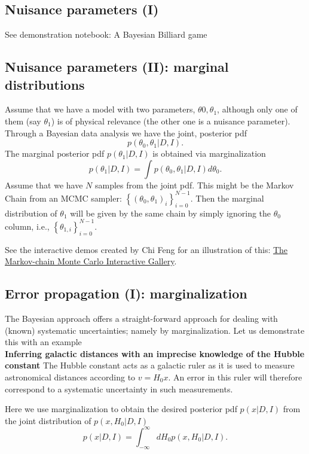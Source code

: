 \documentclass[%
oneside,                 %
final,                   %
10pt]{article}
\begin{document}
\subsection{Nuisance parameters (I)}
See demonstration notebook: A Bayesian Billiard game

\subsection{Nuisance parameters (II): marginal distributions}
Assume that we have a model with two parameters, $\theta0,\theta_1$, although only one of them (say $\theta_1$) is of physical relevance (the other one is a nuisance parameter). Through a Bayesian data analysis we have the joint, posterior pdf
\[
p(\theta_0, \theta_1 | D, I).
\]
The marginal posterior pdf $p(\theta_1 | D, I)$ is obtained via marginalization
\[
p(\theta_1 | D, I) = \int p(\theta_0, \theta_1 | D, I) d\theta_0.
\]
Assume that we have $N$ samples from the joint pdf. This might be the Markov Chain from an MCMC sampler: $\left\{ (\theta_0, \theta_1)_i \right\}_{i=0}^{N-1}$. Then the marginal distribution of $\theta_1$ will be given by the same chain by simply ignoring the $\theta_0$ column, i.e., $\left\{ \theta_{1,i} \right\}_{i=0}^{N-1}$. 

See the interactive demos created by Chi Feng for an illustration of this: \href{{https://chi-feng.github.io/mcmc-demo/}}{The Markov-chain Monte Carlo Interactive Gallery}.

\subsection{Error propagation (I): marginalization}
The Bayesian approach offers a straight-forward approach for dealing with (known) systematic uncertainties; namely by marginalization. Let us demonstrate this with an example \\

\textbf{Inferring galactic distances with an imprecise knowledge of the Hubble constant}
The Hubble constant acts as a galactic ruler as it is used to measure astronomical distances according to $v = H_0 x$. An error in this ruler will therefore correspond to a systematic uncertainty in such measurements.

Here we use marginalization to obtain the desired posterior pdf $p(x|D,I)$ from the joint distribution of $p(x,H_0|D,I)$
\begin{equation}
p(x|D,I) = \int_{-\infty}^\infty dH_0 p(x,H_0|D,I).
\label{eq:marginalization}
\end{equation}
\end{document}
